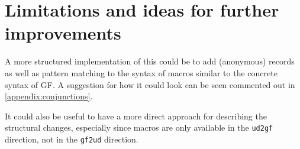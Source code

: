 
\section{Limitations and ideas for further improvements}

A more structured implementation of this could be to add (anonymous) records as well as pattern matching to the syntax of macros similar to the concrete syntax of GF. A suggestion for how it could look can be seen commented out in \autoref{appendix:conjunctions}.

It could also be useful to have a more direct approach for describing the structural changes, especially since macros are only available in the \texttt{ud2gf} direction, not in the \texttt{gf2ud} direction.
